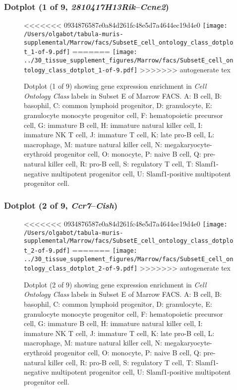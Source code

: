 \clearpage

\subsubsection{Dotplot (1 of 9, \emph{2810417H13Rik}--\emph{Ccne2})}
\begin{figure}[h]
\centering
<<<<<<< 0934876587e0a84d261fc48e5d7a4644ec19d4e0
\texttt{[image: /Users/olgabot/tabula-muris-supplemental/Marrow/facs/SubsetE\_cell\_ontology\_class\_dotplot\_1-of-9.pdf]}
=======
\texttt{[image: ../30\_tissue\_supplement\_figures/Marrow/facs/SubsetE\_cell\_ontology\_class\_dotplot\_1-of-9.pdf]}
>>>>>>> autogenerate tex

\caption{ Dotplot (1 of 9)  showing gene expression enrichment in \emph{Cell Ontology Class} labels in Subset E of Marrow FACS. A: B cell, B: basophil, C: common lymphoid progenitor, D: granulocyte, E: granulocyte monocyte progenitor cell, F: hematopoietic precursor cell, G: immature B cell, H: immature natural killer cell, I: immature NK T cell, J: immature T cell, K: late pro-B cell, L: macrophage, M: mature natural killer cell, N: megakaryocyte-erythroid progenitor cell, O: monocyte, P: naive B cell, Q: pre-natural killer cell, R: pro-B cell, S: regulatory T cell, T: Slamf1-negative multipotent progenitor cell, U: Slamf1-positive multipotent progenitor cell.}
\end{figure}


\clearpage

\subsubsection{Dotplot (2 of 9, \emph{Ccr7}--\emph{Cish})}
\begin{figure}[h]
\centering
<<<<<<< 0934876587e0a84d261fc48e5d7a4644ec19d4e0
\texttt{[image: /Users/olgabot/tabula-muris-supplemental/Marrow/facs/SubsetE\_cell\_ontology\_class\_dotplot\_2-of-9.pdf]}
=======
\texttt{[image: ../30\_tissue\_supplement\_figures/Marrow/facs/SubsetE\_cell\_ontology\_class\_dotplot\_2-of-9.pdf]}
>>>>>>> autogenerate tex

\caption{ Dotplot (2 of 9)  showing gene expression enrichment in \emph{Cell Ontology Class} labels in Subset E of Marrow FACS. A: B cell, B: basophil, C: common lymphoid progenitor, D: granulocyte, E: granulocyte monocyte progenitor cell, F: hematopoietic precursor cell, G: immature B cell, H: immature natural killer cell, I: immature NK T cell, J: immature T cell, K: late pro-B cell, L: macrophage, M: mature natural killer cell, N: megakaryocyte-erythroid progenitor cell, O: monocyte, P: naive B cell, Q: pre-natural killer cell, R: pro-B cell, S: regulatory T cell, T: Slamf1-negative multipotent progenitor cell, U: Slamf1-positive multipotent progenitor cell.}
\end{figure}


